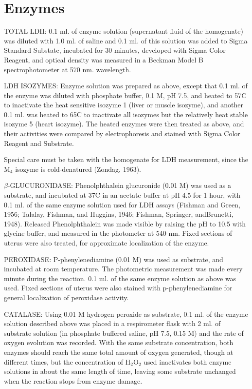 \section{Enzymes}

TOTAL LDH: 0.1 ml. of enzyme solution (supernatant fluid of the homogenate) was diluted with 1.0 ml. of saline and 0.1 ml. of this solution was added to Sigma Standard Substate, incubated
for 30 minutes, developed with Sigma Color Reagent, and optical density was measured in a Beckman Model B spectrophotometer at 570 nm. wavelength.

LDH ISOZYMES: Enzyme solution was prepared as above, except that 0.1 ml. of the enzyme was diluted with phosphate buffer, 0.1 M, pH 7.5, and heated to 57\textdegree{}C to inactivate the heat
sensitive isozyme 1 (liver or muscle isozyme), and another 0.1 ml. was heated to 65\textdegree{}C to inactivate all isozymes but the relatively heat stable isozyme 5 (heart isozyme). The heated
enzymes were then treated as above, and their activities were compared by electrophoresis and stained with Sigma Color Reagent and Substrate.

Special care must be taken with the homogenate for LDH measurement, since the M$_{4}$ isozyme is cold-denatured (Zondag, 1963).

$\beta$-GLUCURONIDASE: Phenolphthalein glucuronide (0.01 M) was used as a substrate, and incubated at 37\textdegree{}C in an acetate buffer at pH 4.5 for 1 hour, with 0.1 ml. of the same enzyme solution
used for LDH assays (Fishman and Green, 1956; Talalay, Fishman, and Huggins, 1946; Fishman, Springer, andBrunetti, 1948). Released Phenolphthalein was made visible by raising the pH to 10.5 with glycine
buffer, and measured in the photometer at 540 nm. Fixed sections of uterus were also treated, for approximate localization of the enzyme.

PEROXIDASE: P-phenylenediamine (0.01 M) was used as substrate, and incubated at room temperature. The photometric measurement was made every minute during the reaction. 0.1 ml. of the same enzyme solution
as above was used. Fixed sections of uterus were also stained with p-phenylenediamine for general localization of peroxidase activity.

CATALASE: Using 0.01 M hydrogen peroxide as substrate, 0.1 ml. of the enzyme solution described above was placed in a respirometer flask with 2 ml. of substrate solution (in phosphate buffered saline, pH
7.5, 0.15 M) and the rate of oxygen evolution was recorded. With the same substrate concentration, both enzymes should reach the same total amount of oxygen generated, though at different times, but the concentration
of H$_{2}$O$_{2}$ used inactivates both enzyme solutions in about the same length of time, leaving some substrate unchanged when the reaction stops from enzyme damage.

